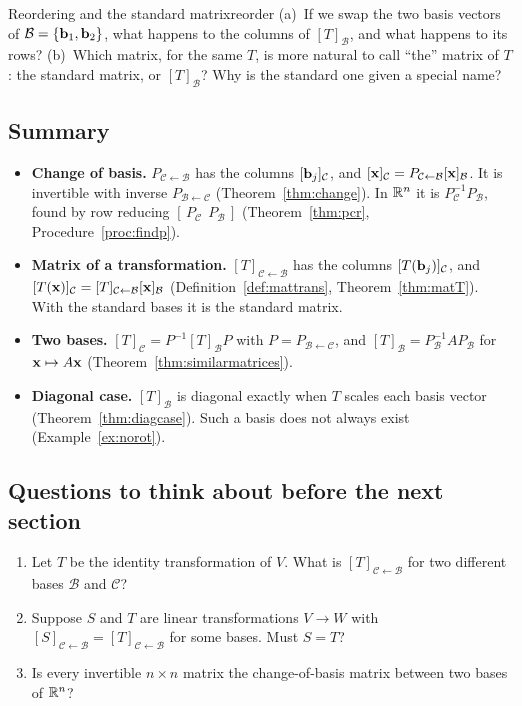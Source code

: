 \documentclass[11pt]{article}
\begin{document}
\begin{think}{Reordering and the standard matrix}{reorder}
(a)~If we swap the two basis vectors of $\mathcal{B}=\{\mathbf{b}_1,\mathbf{b}_2\}$, what happens to the columns of $[T]_{\mathcal{B}}$, and what happens to its rows? (b)~Which matrix, for the same $T$, is more natural to call ``the'' matrix of $T$: the standard matrix, or $[T]_{\mathcal{B}}$? Why is the standard one given a special name?
\end{think}

\subsection*{Summary}
\begin{itemize}
  \item \textbf{Change of basis.} $P_{\mathcal{C}\leftarrow\mathcal{B}}$ has the columns $[\mathbf{b}_j]_{\mathcal{C}}$, and $[\mathbf{x}]_{\mathcal{C}}=P_{\mathcal{C}\leftarrow\mathcal{B}}[\mathbf{x}]_{\mathcal{B}}$. It is invertible with inverse $P_{\mathcal{B}\leftarrow\mathcal{C}}$ (Theorem~\ref{thm:change}). In $\mathbb{R}^n$ it is $P_{\mathcal{C}}^{-1}P_{\mathcal{B}}$, found by row reducing $[\,P_{\mathcal{C}}\ \ P_{\mathcal{B}}\,]$ (Theorem~\ref{thm:pcr}, Procedure~\ref{proc:findp}).
  \item \textbf{Matrix of a transformation.} $[T]_{\mathcal{C}\leftarrow\mathcal{B}}$ has the columns $[T(\mathbf{b}_j)]_{\mathcal{C}}$, and $[T(\mathbf{x})]_{\mathcal{C}}=[T]_{\mathcal{C}\leftarrow\mathcal{B}}[\mathbf{x}]_{\mathcal{B}}$ (Definition~\ref{def:mattrans}, Theorem~\ref{thm:matT}). With the standard bases it is the standard matrix.
  \item \textbf{Two bases.} $[T]_{\mathcal{C}}=P^{-1}[T]_{\mathcal{B}}P$ with $P=P_{\mathcal{B}\leftarrow\mathcal{C}}$, and $[T]_{\mathcal{B}}=P_{\mathcal{B}}^{-1}AP_{\mathcal{B}}$ for $\mathbf{x}\mapsto A\mathbf{x}$ (Theorem~\ref{thm:similarmatrices}).
  \item \textbf{Diagonal case.} $[T]_{\mathcal{B}}$ is diagonal exactly when $T$ scales each basis vector (Theorem~\ref{thm:diagcase}). Such a basis does not always exist (Example~\ref{ex:norot}).
\end{itemize}

\subsection*{Questions to think about before the next section}
\begin{enumerate}[nosep]
  \item Let $T$ be the identity transformation of $V$. What is $[T]_{\mathcal{C}\leftarrow\mathcal{B}}$ for two different bases $\mathcal{B}$ and $\mathcal{C}$?
  \item Suppose $S$ and $T$ are linear transformations $V\to W$ with $[S]_{\mathcal{C}\leftarrow\mathcal{B}}=[T]_{\mathcal{C}\leftarrow\mathcal{B}}$ for some bases. Must $S=T$?
  \item Is every invertible $n\times n$ matrix the change-of-basis matrix between two bases of $\mathbb{R}^n$?
\end{enumerate}
\end{document}
